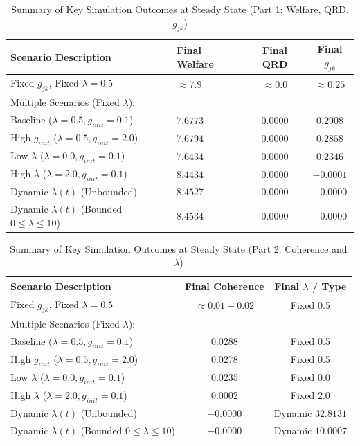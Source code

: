 \documentclass[9pt]{article}
\begin{document}
\begin{table}[h!]
    \centering
    \caption{Summary of Key Simulation Outcomes at Steady State (Part 1: Welfare, QRD, $g_{jk}$)}
    \label{tab:summary_of_findings_part1}
    \begin{tabularx}{\textwidth}{l|X|c|c}
        \toprule
        \textbf{Scenario Description} & \textbf{Final Welfare} & \textbf{Final QRD} & \textbf{Final $g_{jk}$} \\
        \midrule
        Fixed $g_{jk}$, Fixed $\lambda=0.5$ & $\approx 7.9$ & $\approx 0.0$ & $\approx 0.25$ \\
        \midrule
        Multiple Scenarios (Fixed $\lambda$): & & & \\
        \quad Baseline ($\lambda=0.5, g_{init}=0.1$) & $7.6773$ & $0.0000$ & $0.2908$ \\
        \quad High $g_{init}$ ($\lambda=0.5, g_{init}=2.0$) & $7.6794$ & $0.0000$ & $0.2858$ \\
        \quad Low $\lambda$ ($\lambda=0.0, g_{init}=0.1$) & $7.6434$ & $0.0000$ & $0.2346$ \\
        \quad High $\lambda$ ($\lambda=2.0, g_{init}=0.1$) & $8.4434$ & $0.0000$ & $-0.0001$ \\
        \midrule
        Dynamic $\lambda(t)$ (Unbounded) & $8.4527$ & $0.0000$ & $-0.0000$ \\
        \midrule
        Dynamic $\lambda(t)$ (Bounded $0 \le \lambda \le 10$) & $8.4534$ & $0.0000$ & $-0.0000$ \\
        \bottomrule
    \end{tabularx}
\end{table}

\begin{table}[h!]
    \centering
    \caption{Summary of Key Simulation Outcomes at Steady State (Part 2: Coherence and $\lambda$)}
    \label{tab:summary_of_findings_part2}
    \begin{tabularx}{\textwidth}{l|c|c}
        \toprule
        \textbf{Scenario Description} & \textbf{Final Coherence} & \textbf{Final $\lambda$ / Type} \\
        \midrule
        Fixed $g_{jk}$, Fixed $\lambda=0.5$ & $\approx 0.01-0.02$ & Fixed 0.5 \\
        \midrule
        Multiple Scenarios (Fixed $\lambda$): & & \\
        \quad Baseline ($\lambda=0.5, g_{init}=0.1$) & $0.0288$ & Fixed 0.5 \\
        \quad High $g_{init}$ ($\lambda=0.5, g_{init}=2.0$) & $0.0278$ & Fixed 0.5 \\
        \quad Low $\lambda$ ($\lambda=0.0, g_{init}=0.1$) & $0.0235$ & Fixed 0.0 \\
        \quad High $\lambda$ ($\lambda=2.0, g_{init}=0.1$) & $0.0002$ & Fixed 2.0 \\
        \midrule
        Dynamic $\lambda(t)$ (Unbounded) & $-0.0000$ & Dynamic $32.8131$ \\
        \midrule
        Dynamic $\lambda(t)$ (Bounded $0 \le \lambda \le 10$) & $-0.0000$ & Dynamic $10.0007$ \\
        \bottomrule
    \end{tabularx}
\end{table}
\end{document}

